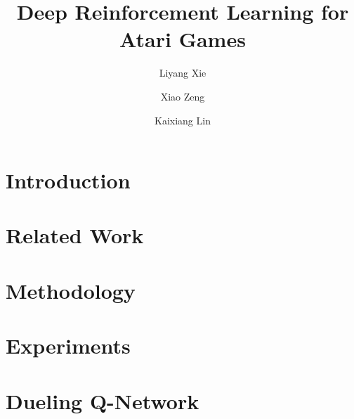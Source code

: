 \documentclass[10pt,twocolumn,letterpaper]{article}
\begin{document}
\title{Deep Reinforcement Learning for Atari Games}

\author{Liyang Xie \and Xiao Zeng \and Kaixiang Lin\\}

\maketitle


\begin{abstract}

\end{abstract}

\section{Introduction}




\section{Related Work}




\section{Methodology}





\section{Experiments}


\section{Dueling Q-Network}

\end{document}
